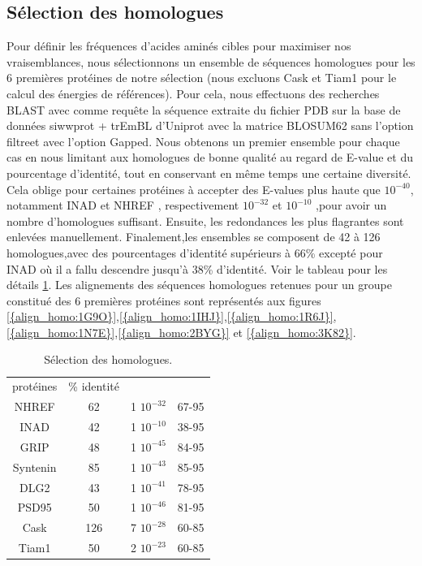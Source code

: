 \subsection{Sélection des homologues}


Pour définir les fréquences d'acides aminés cibles pour maximiser nos vraisemblances, nous sélectionnons un ensemble de séquences homologues pour les 6 premières protéines de notre sélection (nous excluons Cask et Tiam1 pour le calcul des énergies de références). Pour cela, nous effectuons des recherches BLAST avec comme requête la séquence extraite du fichier PDB sur la base de données \og siwwprot + trEmBL \fg d'Uniprot avec la matrice BLOSUM62 sans l'option \og filtre\fg et avec l'option \og Gapped\fg. Nous obtenons un premier ensemble pour chaque cas en nous limitant aux homologues de bonne qualité au regard de E-value et du pourcentage d'identité, tout en conservant  en même temps une certaine diversité. Cela oblige pour certaines protéines à accepter des E-values plus haute que  $10^{-40}$, notamment INAD et NHREF , respectivement $10^{-32}$ et $10^{-10}$ ,pour avoir un nombre d'homologues suffisant. Ensuite, les redondances les plus flagrantes sont enlevées manuellement. Finalement,les ensembles se composent de 42 à 126 homologues,avec des pourcentages d'identité supérieurs à 66\% excepté pour INAD où il a fallu descendre jusqu'à 38\% d'identité. Voir le tableau pour les détails \ref{tab:select_homo}. Les alignements des séquences homologues retenues pour un groupe constitué des 6 premières protéines sont représentés aux figures \ref{{align_homo:1G9O}},\ref{{align_homo:1IHJ}},\ref{{align_homo:1R6J}},\ref{{align_homo:1N7E}},\ref{{align_homo:2BYG}} et \ref{{align_homo:3K82}}.


    \begin{table}[!htbp]
      \centering
      \caption{Sélection des homologues.}
      \begin{tabular}{cccc}

        \toprule
        protéines & \% identité & &\\
        \cmidrule{1-4}
     NHREF  & 62  &    1 $10^{-32}$  &  67-95 \\
     INAD  & 42  &    1 $10^{-10}$  &  38-95 \\
     GRIP  & 48  &    1 $10^{-45}$  &  84-95 \\
     Syntenin  & 85  &    1 $10^{-43}$  &  85-95 \\
     DLG2  & 43  &    1 $10^{-41}$  &  78-95 \\
     PSD95  & 50  &    1 $10^{-46}$  &  81-95 \\
     \cmidrule{1-4}
     Cask  & 126 &    7 $10^{-28}$  &  60-85 \\
     Tiam1 & 50  &    2 $10^{-23}$  &  60-85 \\

        \bottomrule

      \end{tabular}      
      \label{tab:select_homo}      
    \end{table}


